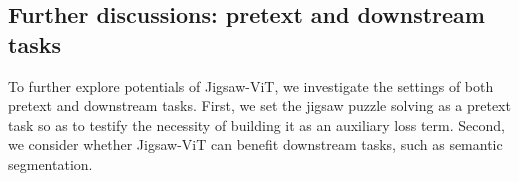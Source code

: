 \documentclass{article}
\begin{document}
    \captionsetup[table]{farskip=2pt,captionskip=1pt,aboveskip=4pt}
    \begin{table}[t]
    \renewcommand{\arraystretch}{1.1}
    \begin{center}
        \caption{{\textbf{Semantic segmentation as a downstream task.}
        Performance of Segmenters~\cite{strudel2021segmenter} on ADE20K~\cite{zhou2019semantic} validation set with pretrained weights provided by DeiT~\cite{touvron2021training} and Jigsaw-ViT trained on ImageNet{-1K}~\cite{deng2009imagenet}.
        We also show how much Segmenter with Jigsaw-ViT pretrained weight improves over its DeiT pretrained counterpart with \textcolor{ForestGreen}{}.}}
        \label{tab::seg}
    \end{center}
    \end{table}

\subsection{{Further discussions: pretext and downstream tasks}}
\label{sec::further}
To further explore potentials of Jigsaw-ViT,
we investigate the settings of both pretext and downstream tasks.
First, we set the jigsaw puzzle solving as a pretext task so as to testify the necessity of building it as an auxiliary loss term.
Second, we consider whether Jigsaw-ViT can benefit downstream tasks, such as semantic segmentation.
\end{document}
